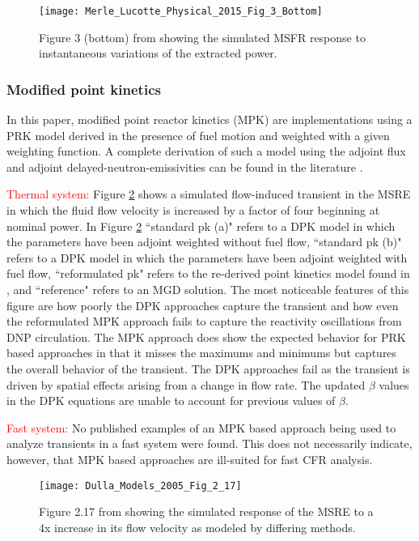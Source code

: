 \documentclass[review]{elsarticle}
\begin{document}
\begin{figure}[H]
   \centering
   \texttt{[image: Merle\_Lucotte\_Physical\_2015\_Fig\_3\_Bottom]}
   \caption{Figure 3 (bottom) from \cite{merle-lucotte_physical_2015} showing the simulated MSFR
   response to instantaneous variations of the extracted power.} 
   \label{fig:lucotte_ipk}
\end{figure}

\subsubsection{Modified point kinetics} \label{sssec:mpk}
In this paper,
modified point reactor kinetics (MPK) are implementations
using a PRK model derived in the presence of fuel motion
and weighted with a given weighting function. A complete derivation of such a
model using the adjoint flux and adjoint delayed-neutron-emissivities can be
found in the literature \cite{dulla_models_2005}.
\par \textcolor{red}{Thermal system:} Figure 
\ref{fig:dulla_4x_flow} shows a simulated flow-induced transient in the MSRE
in which the fluid flow velocity is increased by a factor
of four beginning at nominal power.
In Figure \ref{fig:dulla_4x_flow} ``standard pk (a)" refers
to a DPK model in which the parameters have been adjoint weighted without fuel
flow, ``standard pk (b)" refers to a DPK model in which the parameters have
been adjoint weighted with fuel flow, ``reformulated pk" refers to the re-derived
point kinetics model found in \cite{dulla_models_2005}, and ``reference" refers
to an MGD solution. The most noticeable features of this figure are how poorly the
DPK approaches capture the transient and how even the reformulated MPK approach
fails to capture the reactivity oscillations from DNP circulation. The
MPK  approach does show the expected behavior for PRK based approaches in that
it misses the maximums and minimums but captures the overall behavior of the
transient. The DPK approaches fail as the transient is driven by spatial effects
arising from a change in flow rate. The updated $\beta$ values in the DPK equations
are unable to account for previous values of $\beta$.
\par \textcolor{red}{Fast system:} No published examples of an MPK based approach being used
to analyze transients in a fast system were found. This does not
necessarily indicate, however, that MPK based approaches are ill-suited for fast
CFR analysis.

\begin{figure}[H]
   \centering
   \texttt{[image: Dulla\_Models\_2005\_Fig\_2\_17]}
   \caption{Figure 2.17 from \cite{dulla_models_2005} showing the simulated response of the MSRE
   to a 4x increase in its flow velocity as modeled by differing methods.} 
   \label{fig:dulla_4x_flow}
\end{figure}
\end{document}
